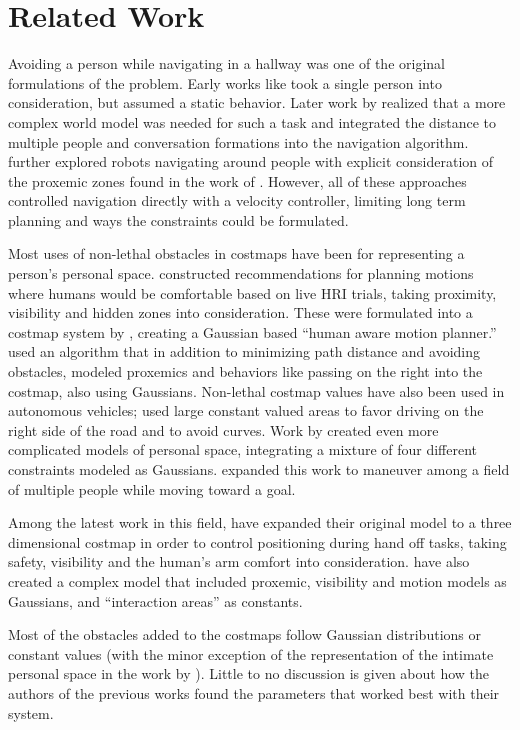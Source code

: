 \section{Related Work}
Avoiding a person while navigating in a hallway was one of the original formulations of the problem. Early works like \citet{yoda1997} took a single person into consideration, but assumed a static behavior. Later work by \citet{christensen2004} realized that a more complex world model was needed for such a task and integrated the distance to multiple people and conversation formations into the navigation algorithm. 
\citet{christensen2005} further explored robots navigating around people with explicit consideration of the proxemic zones found in the work of \citet{hall1969}. However, all of these approaches controlled navigation directly with a velocity controller, limiting long term planning and ways the constraints could be formulated. 

Most uses of non-lethal obstacles in costmaps have been for representing a person's personal space. \citet{dautenhahn:serveseated} %
constructed recommendations for planning motions where humans would be comfortable based on live HRI trials, taking proximity, visibility and hidden zones into consideration. These were formulated into a costmap system by \citet{sisbot2007}, creating a Gaussian based ``human aware motion planner.'' 
\citet{kirby:companion} used an algorithm that in addition to minimizing path distance and avoiding obstacles, modeled proxemics and behaviors like passing on the right into the costmap, also using Gaussians. Non-lethal costmap values have also been used in autonomous vehicles; \citet{likhachev:costmaps} used large constant valued areas to favor driving on the right side of the road and to avoid curves. 
Work by \citet{svenstrup2009}\cite{svenstrup2010} created even more complicated models of personal space, integrating a mixture of four different constraints modeled as Gaussians.  expanded this work to maneuver among a field of multiple people while moving toward a goal. 

Among the latest work in this field, \citet{sisbot2011} have expanded their original model to a three dimensional costmap in order to control positioning during hand off tasks, taking safety, visibility and the human's arm comfort into consideration. \citet{fraichard:anthronav} have also created a complex model that included proxemic, visibility and motion models as Gaussians, and ``interaction areas'' as constants. 

Most of the obstacles added to the costmaps follow Gaussian distributions or constant values (with the minor exception of the representation of the intimate personal space in the work by \citet{fraichard:anthronav}). Little to no discussion is given about how the authors of the previous works found the parameters that worked best with their system. 








